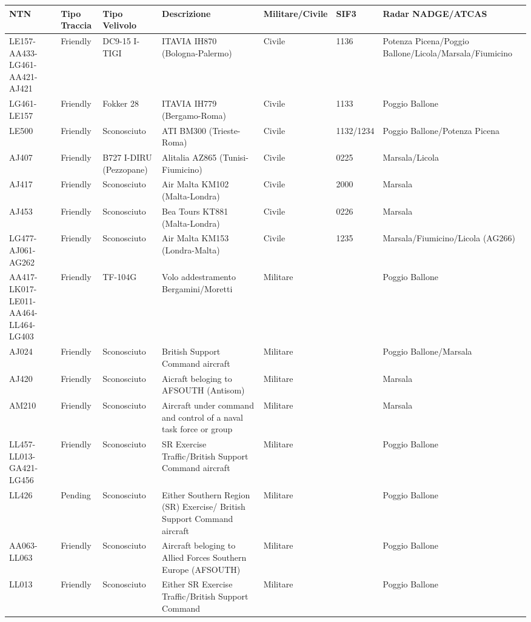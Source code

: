 \documentclass[
]{article}
\author{}
\date{}
\begin{document}
\begin{longtable}[]{@{}lllllll@{}}
\toprule
NTN & Tipo Traccia & Tipo Velivolo & Descrizione & Militare/Civile &
SIF3 & Radar NADGE/ATCAS \\
\midrule
\endhead
LE157-AA433-LG461-AA421-AJ421 & Friendly & DC9-15 I-TIGI & ITAVIA IH870
(Bologna-Palermo) & Civile & 1136 & Potenza Picena/Poggio
Ballone/Licola/Marsala/Fiumicino \\
LG461-LE157 & Friendly & Fokker 28 & ITAVIA IH779 (Bergamo-Roma) &
Civile & 1133 & Poggio Ballone \\
LE500 & Friendly & Sconosciuto & ATI BM300 (Trieste-Roma) & Civile &
1132/1234 & Poggio Ballone/Potenza Picena \\
AJ407 & Friendly & B727 I-DIRU (Pezzopane) & Alitalia AZ865
(Tunisi-Fiumicino) & Civile & 0225 & Marsala/Licola \\
AJ417 & Friendly & Sconosciuto & Air Malta KM102 (Malta-Londra) & Civile
& 2000 & Marsala \\
AJ453 & Friendly & Sconosciuto & Bea Tours KT881 (Malta-Londra) & Civile
& 0226 & Marsala \\
LG477-AJ061-AG262 & Friendly & Sconosciuto & Air Malta KM153
(Londra-Malta) & Civile & 1235 & Marsala/Fiumicino/Licola (AG266) \\
AA417-LK017-LE011-AA464-LL464-LG403 & Friendly & TF-104G & Volo
addestramento Bergamini/Moretti & Militare & & Poggio Ballone \\
AJ024 & Friendly & Sconosciuto & British Support Command aircraft &
Militare & & Poggio Ballone/Marsala \\
AJ420 & Friendly & Sconosciuto & Aicraft beloging to AFSOUTH (Antisom) &
Militare & & Marsala \\
AM210 & Friendly & Sconosciuto & Aircraft under command and control of a
naval task force or group & Militare & & Marsala \\
LL457-LL013-GA421-LG456 & Friendly & Sconosciuto & SR Exercise
Traffic/British Support Command aircraft & Militare & & Poggio
Ballone \\
LL426 & Pending & Sconosciuto & Either Southern Region (SR) Exercise/
British Support Command aircraft & Militare & & Poggio Ballone \\
AA063-LL063 & Friendly & Sconosciuto & Aircraft beloging to Allied
Forces Southern Europe (AFSOUTH) & Militare & & Poggio Ballone \\
LL013 & Friendly & Sconosciuto & Either SR Exercise Traffic/British
Support Command & Militare & & Poggio Ballone \\

\end{longtable}
\end{document}
